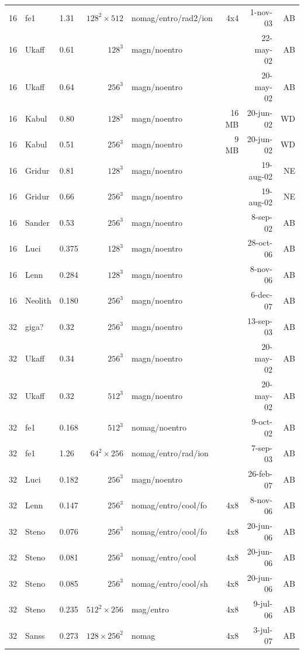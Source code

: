 \documentclass[\mydriver,12pt,twoside,notitlepage,a4paper]{article}
\begin{document}
\begin{center}
\begin{small}
\begin{longtable}{rllrlrrr}
  16 & fe1   & 1.31 & $128^2{\times}512$
                     & nomag/entro/rad2/ion &  4x4   &  1-nov-03 & AB \\
  16 & Ukaff & 0.61 & $128^3$ & magn/noentro &        & 22-may-02 & AB \\
  16 & Ukaff & 0.64 & $256^3$ & magn/noentro &        & 20-may-02 & AB \\
  16 & Kabul & 0.80 & $128^3$ & magn/noentro &  16 MB & 20-jun-02 & WD \\
  16 & Kabul & 0.51 & $256^3$ & magn/noentro &   9 MB & 20-jun-02 & WD \\
  16 & Gridur& 0.81 & $128^3$ & magn/noentro &        & 19-aug-02 & NE \\
  16 & Gridur& 0.66 & $256^3$ & magn/noentro &        & 19-aug-02 & NE \\
  16 & Sander& 0.53 & $256^3$ & magn/noentro &        &  8-sep-02 & AB \\
  16 & Luci  & 0.375& $128^3$ & magn/noentro &        & 28-oct-06 & AB \\
  16 & Lenn  & 0.284& $128^3$ & magn/noentro &        &  8-nov-06 & AB \\
  16 &Neolith& 0.180& $256^3$ & magn/noentro &        &  6-dec-07 & AB \\
  32 & giga? & 0.32 & $256^3$ & magn/noentro &        & 13-sep-03 & AB \\
  32 & Ukaff & 0.34 & $256^3$ & magn/noentro &        & 20-may-02 & AB \\
  32 & Ukaff & 0.32 & $512^3$ & magn/noentro &        & 20-may-02 & AB \\
  32 & fe1   & 0.168& $512^3$ &nomag/noentro&        &  9-oct-02 & AB \\
  32 & fe1   & 1.26 & $64^2\times256$ &nomag/entro/rad/ion& & 7-sep-03 & AB \\
  32 & Luci  & 0.182& $256^3$ &magn/noentro &        & 26-feb-07 & AB \\
  32 & Lenn  & 0.147& $256^3$ &nomag/entro/cool/fo& 4x8 &  8-nov-06 & AB \\
  32 & Steno & 0.076& $256^3$ &nomag/entro/cool/fo& 4x8 & 20-jun-06 & AB \\
  32 & Steno & 0.081& $256^3$ &nomag/entro/cool& 4x8 & 20-jun-06 & AB \\
  32 & Steno & 0.085& $256^3$ &nomag/entro/cool/sh& 4x8 & 20-jun-06 & AB \\
  32 & Steno & 0.235& $512^2\times256$ &mag/entro& 4x8 &  9-jul-06 & AB \\
  32 & Sanss & 0.273& $128\times256^2$ &nomag& 4x8 &  3-jul-07 & AB \\

\end{longtable}
\end{small}
\end{center}
\end{document}
